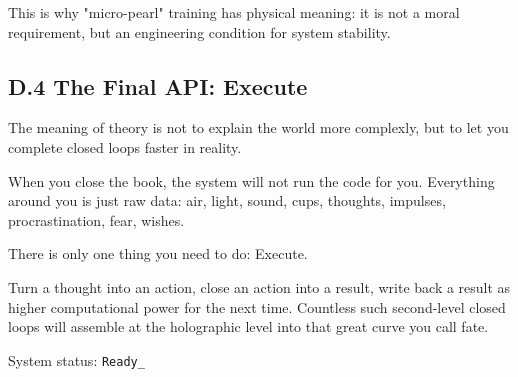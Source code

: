 This is why "micro-pearl" training has physical meaning: it is not a moral requirement, but an engineering condition for system stability.

\subsection*{D.4 The Final API: Execute}

The meaning of theory is not to explain the world more complexly, but to let you complete closed loops faster in reality.

When you close the book, the system will not run the code for you. Everything around you is just raw data: air, light, sound, cups, thoughts, impulses, procrastination, fear, wishes.

There is only one thing you need to do: Execute.

Turn a thought into an action, close an action into a result, write back a result as higher computational power for the next time. Countless such second-level closed loops will assemble at the holographic level into that great curve you call fate.

System status: \texttt{Ready\_}

